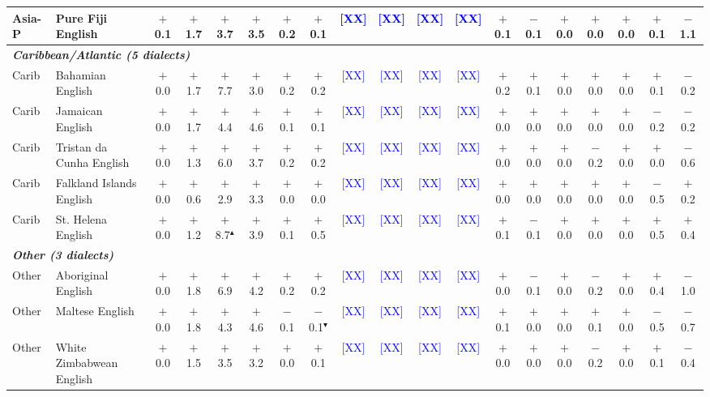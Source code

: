 \begin{table}[t]
\begin{tabular}{llccccccccccccccccc}
Asia-P & Pure Fiji English & $+$0.1 & $+$1.7 & $+$3.7 & $+$3.5 & $+$0.2 & $+$0.1 & \textcolor{blue}{[XX]} & \textcolor{blue}{[XX]} & \textcolor{blue}{[XX]} & \textcolor{blue}{[XX]} & $+$0.1 & $-$0.1 & $+$0.0 & $+$0.0 & $+$0.0 & $+$0.1 & $-$1.1 \\
\midrule
\multicolumn{19}{l}{\textit{\textbf{Caribbean/Atlantic (5 dialects)}}} \\
Carib & Bahamian English & $+$0.0 & $+$1.7 & $+$7.7 & $+$3.0 & $+$0.2 & $+$0.2 & \textcolor{blue}{[XX]} & \textcolor{blue}{[XX]} & \textcolor{blue}{[XX]} & \textcolor{blue}{[XX]} & $+$0.2 & $+$0.1 & $+$0.0 & $+$0.0 & $+$0.0 & $+$0.1 & $-$0.2 \\
Carib & Jamaican English & $+$0.0 & $+$1.7 & $+$4.4 & $+$4.6 & $+$0.1 & $+$0.1 & \textcolor{blue}{[XX]} & \textcolor{blue}{[XX]} & \textcolor{blue}{[XX]} & \textcolor{blue}{[XX]} & $+$0.0 & $+$0.0 & $+$0.0 & $+$0.0 & $+$0.0 & $-$0.2 & $-$0.2 \\
Carib & Tristan da Cunha English & $+$0.0 & $+$1.3 & $+$6.0 & $+$3.7 & $+$0.2 & $+$0.2 & \textcolor{blue}{[XX]} & \textcolor{blue}{[XX]} & \textcolor{blue}{[XX]} & \textcolor{blue}{[XX]} & $+$0.0 & $+$0.0 & $+$0.0 & $-$0.2 & $+$0.0 & $+$0.0 & $-$0.6 \\
Carib & Falkland Islands English & $+$0.0 & $+$0.6 & $+$2.9 & $+$3.3 & $+$0.0 & $+$0.0 & \textcolor{blue}{[XX]} & \textcolor{blue}{[XX]} & \textcolor{blue}{[XX]} & \textcolor{blue}{[XX]} & $+$0.0 & $+$0.0 & $+$0.0 & $+$0.0 & $+$0.0 & $-$0.5 & $+$0.2 \\
Carib & St. Helena English & $+$0.0 & $+$1.2 & $+$8.7$^\blacktriangle$ & $+$3.9 & $+$0.1 & $+$0.5 & \textcolor{blue}{[XX]} & \textcolor{blue}{[XX]} & \textcolor{blue}{[XX]} & \textcolor{blue}{[XX]} & $+$0.1 & $-$0.1 & $+$0.0 & $+$0.0 & $+$0.0 & $+$0.5 & $+$0.4 \\
\midrule
\multicolumn{19}{l}{\textit{\textbf{Other (3 dialects)}}} \\
Other & Aboriginal English & $+$0.0 & $+$1.8 & $+$6.9 & $+$4.2 & $+$0.2 & $+$0.2 & \textcolor{blue}{[XX]} & \textcolor{blue}{[XX]} & \textcolor{blue}{[XX]} & \textcolor{blue}{[XX]} & $+$0.0 & $-$0.1 & $+$0.0 & $-$0.2 & $+$0.0 & $+$0.4 & $-$1.0 \\
Other & Maltese English & $+$0.0 & $+$1.8 & $+$4.3 & $+$4.6 & $-$0.1 & $-$0.1$^\blacktriangledown$ & \textcolor{blue}{[XX]} & \textcolor{blue}{[XX]} & \textcolor{blue}{[XX]} & \textcolor{blue}{[XX]} & $+$0.1 & $+$0.0 & $+$0.0 & $+$0.1 & $+$0.0 & $-$0.5 & $-$0.7 \\
Other & White Zimbabwean English & $+$0.0 & $+$1.5 & $+$3.5 & $+$3.2 & $+$0.0 & $+$0.1 & \textcolor{blue}{[XX]} & \textcolor{blue}{[XX]} & \textcolor{blue}{[XX]} & \textcolor{blue}{[XX]} & $+$0.0 & $+$0.0 & $+$0.0 & $-$0.2 & $+$0.0 & $+$0.1 & $-$0.4 \\

\end{tabular}
\end{table}
